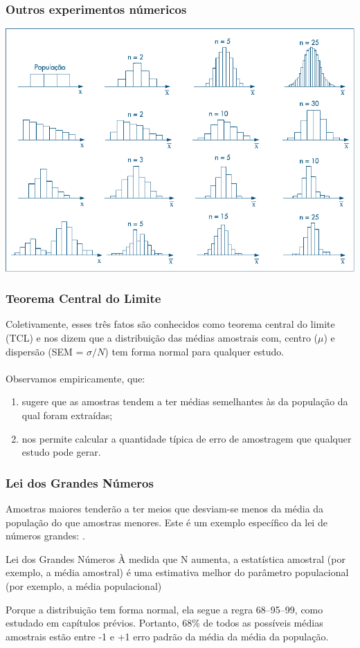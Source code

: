 \documentclass[11pt]{beamer}
\begin{document}
\begin{frame}
\frametitle{Outros experimentos númericos}
\begin{center}\includegraphics[width=0.9\linewidth]{figs/func2}\end{center}
\end{frame}

\begin{frame}
\frametitle{Teorema Central do Limite}
Coletivamente, esses três fatos são conhecidos como teorema central do limite  (TCL) e nos dizem que a distribuição das médias amostrais com, centro (\(\mu\)) e dispersão (SEM = \(\sigma/N\)) tem forma normal para qualquer estudo.\\~\\ 

Observamos empiricamente, que:
\begin{enumerate}
\item sugere que as amostras tendem a ter médias semelhantes às da população da qual foram extraídas;
\item nos permite calcular a quantidade típica de erro de amostragem que qualquer estudo pode gerar.
\end{enumerate}

\end{frame}

\begin{frame}
\frametitle{Lei dos Grandes Números}
Amostras maiores tenderão a ter meios que desviam-se menos da média da população do que amostras menores. Este é um exemplo específico da lei de números grandes: .
 \begin{alertblock}{Lei dos Grandes Números}
À medida que N aumenta, a estatística amostral (por exemplo, a média amostral) é uma estimativa melhor do parâmetro populacional (por exemplo, a média populacional)
\end{alertblock}

Porque a distribuição tem forma normal, ela segue a regra 68–95–99, como estudado em capítulos prévios. Portanto, 68\% de todos as possíveis médias amostrais estão entre -1 e +1 erro padrão da média da média da população.

\end{frame}
\end{document}
